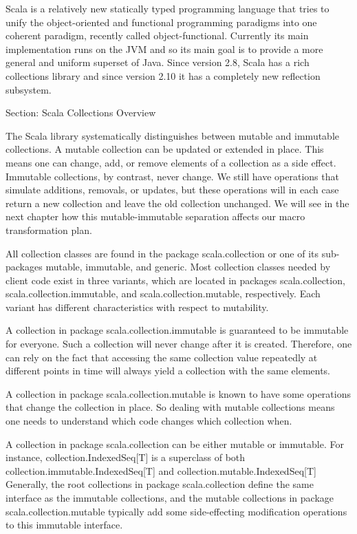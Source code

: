 Scala  is a relatively new statically typed programming language
that tries to unify the object-oriented and functional programming paradigms
into one coherent paradigm, recently called object-functional. Currently its
main implementation runs on the JVM and so its main goal is to provide a more
general and uniform superset of Java. Since version 2.8, Scala has a rich
collections library and since version 2.10 it has a completely new reflection
subsystem.

Section: Scala Collections Overview

The Scala library systematically distinguishes between mutable and immutable
collections. A mutable collection can be updated or extended in place. This
means one can change, add, or remove elements of a collection as a side effect.
Immutable collections, by contrast, never change. We still have operations
that simulate additions, removals, or updates, but these operations will in each
case return a new collection and leave the old collection unchanged. We will see
in the next chapter how this mutable-immutable separation affects our macro
transformation plan.

All collection classes are found in the package scala.collection or one of its
sub-packages mutable, immutable, and generic. Most collection classes needed by
client code exist in three variants, which are located in packages
scala.collection, scala.collection.immutable, and scala.collection.mutable,
respectively. Each variant has different characteristics with respect to
mutability.

A collection in package scala.collection.immutable is guaranteed to be immutable
for everyone. Such a collection will never change after it is created.
Therefore, one can rely on the fact that accessing the same collection value
repeatedly at different points in time will always yield a collection with the
same elements.

A collection in package scala.collection.mutable is known to have some
operations that change the collection in place. So dealing with mutable
collections means one needs to understand which code changes which collection
when.

A collection in package scala.collection can be either mutable or immutable. For
instance, collection.IndexedSeq[T] is a superclass of both
collection.immutable.IndexedSeq[T] and collection.mutable.IndexedSeq[T]
Generally, the root collections in package scala.collection define the same
interface as the immutable collections, and the mutable collections in package
scala.collection.mutable typically add some side-effecting modification
operations to this immutable interface.

